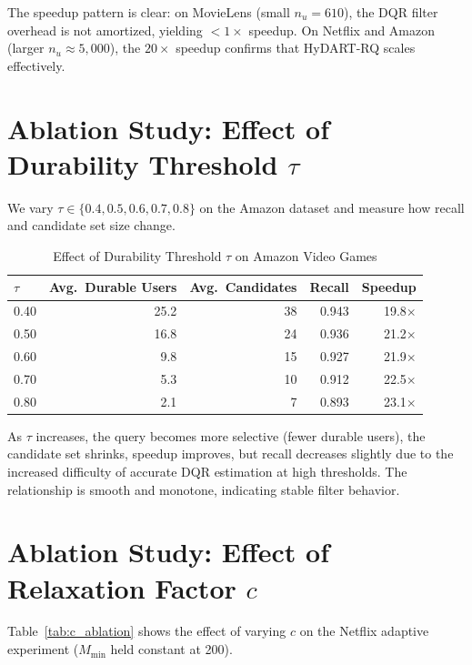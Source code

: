 The speedup pattern is clear: on MovieLens (small $n_u = 610$), the DQR filter overhead is not amortized, yielding $<1\times$ speedup. On Netflix and Amazon (larger $n_u \approx 5{,}000$), the $20\times$ speedup confirms that HyDART-RQ scales effectively.

\section{Ablation Study: Effect of Durability Threshold $\tau$}

We vary $\tau \in \{0.4, 0.5, 0.6, 0.7, 0.8\}$ on the Amazon dataset and measure how recall and candidate set size change.

\begin{table}[htbp]
\centering
\caption{Effect of Durability Threshold $\tau$ on Amazon Video Games}
\label{tab:tau_ablation}
\begin{tabular}{lrrrr}
\toprule
$\tau$ & \textbf{Avg.\ Durable Users} & \textbf{Avg.\ Candidates} & \textbf{Recall} & \textbf{Speedup} \\
\midrule
0.40 & 25.2 & 38 & 0.943 & 19.8$\times$ \\
0.50 & 16.8 & 24 & 0.936 & 21.2$\times$ \\
0.60 &  9.8 & 15 & 0.927 & 21.9$\times$ \\
0.70 &  5.3 & 10 & 0.912 & 22.5$\times$ \\
0.80 &  2.1 &  7 & 0.893 & 23.1$\times$ \\
\bottomrule
\end{tabular}
\end{table}

As $\tau$ increases, the query becomes more selective (fewer durable users), the candidate set shrinks, speedup improves, but recall decreases slightly due to the increased difficulty of accurate DQR estimation at high thresholds. The relationship is smooth and monotone, indicating stable filter behavior.

\section{Ablation Study: Effect of Relaxation Factor $c$}

Table~\ref{tab:c_ablation} shows the effect of varying $c$ on the Netflix adaptive experiment ($M_{\min}$ held constant at 200).

